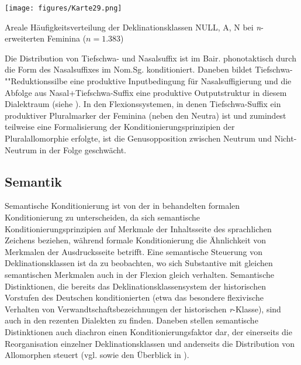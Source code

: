 \begin{map}
\texttt{[image: figures/Karte29.png]}
\caption{Areale Häufigkeitsverteilung der Deklinationsklassen NULL, A, N bei \textit{n}{}-erweiterten Feminina ($n=1.383$)}
\label{map:29}
\end{map}


Die Distribution von Tiefschwa- und Nasalsuffix ist im Bair. phonotaktisch durch die Form des Nasalsuffixes im Nom.Sg. konditioniert. Daneben bildet Tief\-schwa-""Re\-duk\-tions\-sil\-be eine produktive Inputbedingung für Nasalsuffigierung und die Abfolge aus Nasal+Tiefschwa-Suffix eine produktive Outputstruktur in diesem Dialektraum (siehe ). In den Flexionssystemen, in denen Tiefschwa-Suffix ein produktiver Pluralmarker der Feminina (neben den Neutra) ist und zumindest teilweise eine Formalisierung der Konditionierungsprinzipien der Pluralallomorphie erfolgte, ist die Genusopposition zwischen Neutrum und Nicht-Neutrum in der Folge geschwächt.

\subsection{Semantik}\label{sec:8.3.2}
\begin{sloppypar}
Semantische Konditionierung ist von der in  behandelten formalen Konditionierung zu unterscheiden, da sich semantische Konditionierungsprinzipien auf Merkmale der Inhaltsseite des sprachlichen Zeichens beziehen, während formale Konditionierung die Ähnlichkeit von Merkmalen der Ausdrucksseite betrifft. Eine semantische Steuerung von Deklinationsklassen ist da zu beobachten, wo sich Substantive mit gleichen semantischen Merkmalen auch in der Flexion gleich verhalten. Semantische Distinktionen, die bereits das Deklinationsklassensystem der historischen Vorstufen des Deutschen konditionierten (etwa das besondere flexivische Verhalten von Verwandtschaftsbezeichnungen der historischen \textit{r}{}-Klasse), sind auch in den rezenten Dialekten zu finden. Daneben stellen semantische Distinktionen auch diachron einen Konditionierungsfaktor dar, der einerseits die Reorganisation einzelner Deklinationsklassen und anderseits die Distribution von Allomorphen steuert (vgl.  sowie den Überblick in \citealt[100--104 und 116--122]{Kürschner2008a}).
\end{sloppypar}

